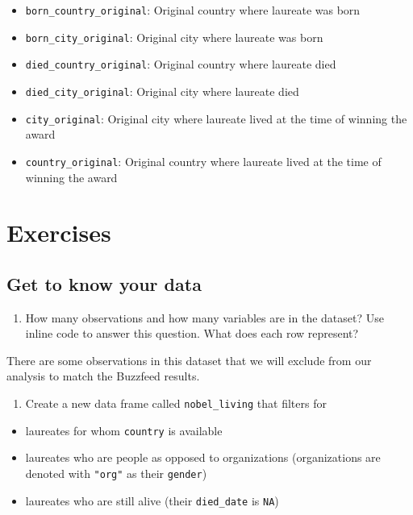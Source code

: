 \documentclass[
]{article}
\providecommand{\tightlist}{%
  \setlength{\itemsep}{0pt}\setlength{\parskip}{0pt}}
\begin{document}
\begin{itemize}
\tightlist
\item
  \texttt{born\_country\_original}: Original country where laureate was
  born
\item
  \texttt{born\_city\_original}: Original city where laureate was born
\item
  \texttt{died\_country\_original}: Original country where laureate died
\item
  \texttt{died\_city\_original}: Original city where laureate died
\item
  \texttt{city\_original}: Original city where laureate lived at the
  time of winning the award
\item
  \texttt{country\_original}: Original country where laureate lived at
  the time of winning the award
\end{itemize}

\section{Exercises}\label{exercises}

\subsection{Get to know your data}\label{get-to-know-your-data}

\begin{enumerate}
\def\labelenumi{\arabic{enumi}.}
\tightlist
\item
  How many observations and how many variables are in the dataset? Use
  inline code to answer this question. What does each row represent?
\end{enumerate}

There are some observations in this dataset that we will exclude from
our analysis to match the Buzzfeed results.

\begin{enumerate}
\def\labelenumi{\arabic{enumi}.}
\setcounter{enumi}{1}
\tightlist
\item
  Create a new data frame called \texttt{nobel\_living} that filters for
\end{enumerate}

\begin{itemize}
\tightlist
\item
  laureates for whom \texttt{country} is available
\item
  laureates who are people as opposed to organizations (organizations
  are denoted with \texttt{"org"} as their \texttt{gender})
\item
  laureates who are still alive (their \texttt{died\_date} is
  \texttt{NA})
\end{itemize}
\end{document}
